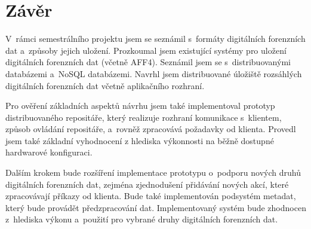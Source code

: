 \chapter{Závěr}
V~rámci semestrálního projektu jsem se seznámil s~formáty digitálních forenzních dat a~způsoby jejich uložení. Prozkoumal jsem existující systémy pro uložení digitálních forenzních dat (včetně AFF4). Seznámil jsem se s~distribuovanými databázemi a~NoSQL databázemi. Navrhl jsem distribuované úložiště rozsáhlých digitálních forenzních dat včetně aplikačního rozhraní.

Pro ověření základních aspektů návrhu jsem také implementoval prototyp distribuovaného repositáře, který realizuje rozhraní komunikace s~klientem, způsob ovládání repositáře, a~rovněž zpracovává požadavky od klienta. Provedl jsem také základní vyhodnocení z hlediska výkonnosti na běžně dostupné hardwarové konfiguraci.

Dalším krokem bude rozšíření implementace prototypu o~podporu nových druhů digitálních forenzních dat, zejména zjednodušení přidávání nových akcí, které zpracovávají příkazy od klienta. Bude také implementován podsystém metadat, který bude provádět předzpracování dat.
Implementovaný systém bude zhodnocen z~hlediska výkonu a~použití pro vybrané druhy digitálních forenzních dat.

